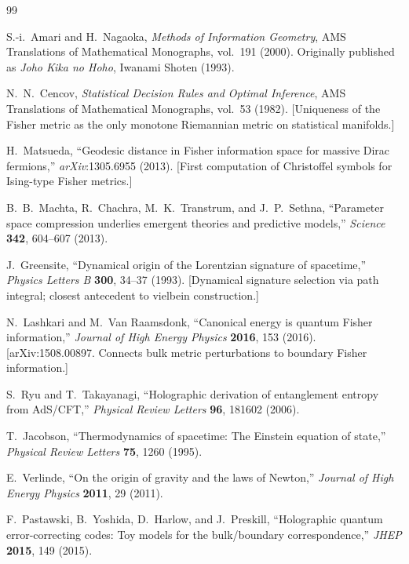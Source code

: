 \documentclass[11pt]{article}
\theoremstyle{definition}
\theoremstyle{remark}
\begin{document}
\begin{thebibliography}{99}

S.-i.\ Amari and H.\ Nagaoka,
\textit{Methods of Information Geometry},
AMS Translations of Mathematical Monographs, vol.\ 191 (2000).
Originally published as \textit{Joho Kika no Hoho}, Iwanami Shoten (1993).

N.\ N.\ Cencov,
\textit{Statistical Decision Rules and Optimal Inference},
AMS Translations of Mathematical Monographs, vol.\ 53 (1982).
[Uniqueness of the Fisher metric as the only monotone Riemannian
metric on statistical manifolds.]

H.\ Matsueda,
``Geodesic distance in Fisher information space for massive Dirac fermions,''
\textit{arXiv}:1305.6955 (2013).
[First computation of Christoffel symbols for Ising-type Fisher metrics.]

B.\ B.\ Machta, R.\ Chachra, M.\ K.\ Transtrum, and J.\ P.\ Sethna,
``Parameter space compression underlies emergent theories and
predictive models,''
\textit{Science} \textbf{342}, 604--607 (2013).

J.\ Greensite,
``Dynamical origin of the Lorentzian signature of spacetime,''
\textit{Physics Letters B} \textbf{300}, 34--37 (1993).
[Dynamical signature selection via path integral; closest antecedent
to vielbein construction.]

N.\ Lashkari and M.\ Van Raamsdonk,
``Canonical energy is quantum Fisher information,''
\textit{Journal of High Energy Physics} \textbf{2016}, 153 (2016).
[arXiv:1508.00897. Connects bulk metric perturbations to boundary
Fisher information.]

S.\ Ryu and T.\ Takayanagi,
``Holographic derivation of entanglement entropy from AdS/CFT,''
\textit{Physical Review Letters} \textbf{96}, 181602 (2006).

T.\ Jacobson,
``Thermodynamics of spacetime: The Einstein equation of state,''
\textit{Physical Review Letters} \textbf{75}, 1260 (1995).

E.\ Verlinde,
``On the origin of gravity and the laws of Newton,''
\textit{Journal of High Energy Physics} \textbf{2011}, 29 (2011).

F.\ Pastawski, B.\ Yoshida, D.\ Harlow, and J.\ Preskill,
``Holographic quantum error-correcting codes: Toy models for the
bulk/boundary correspondence,''
\textit{JHEP} \textbf{2015}, 149 (2015).


\end{thebibliography}
\end{document}
